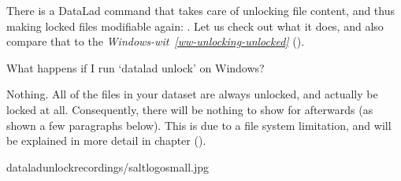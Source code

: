 \ignorespaces 
\sphinxAtStartPar
There is a DataLad command that takes care of unlocking file content,
and thus making locked files modifiable again: .
Let us check out what it does, and also compare that to the
\textit{Windows-wit}~{\windowswiticoninline}\textit{\ref{ww-unlocking-unlocked}} {\hyperref[\detokenize{basics/101-110-run2:ww-unlocking-unlocked}]{}} ().

\ignorespaces \begin{windowswit}[label={ww-unlocking-unlocked}, before title={\thetcbcounter\ }, float, floatplacement=tb, check odd page=true]{What happens if I run ‘datalad unlock’ on Windows?}
\label{\detokenize{basics/101-110-run2:ww-unlocking-unlocked}}

\sphinxAtStartPar
Nothing. All of the files in your dataset are always unlocked, and actually  be locked at all.
Consequently, there will be nothing to show for  afterwards (as shown a few paragraphs below).
This is due to a file system limitation, and will be explained in more detail in chapter {\hyperref[\detokenize{basics/basics-annex:chapter-gitannex}]{}} ().


\end{windowswit}

\begin{sphinxVerbatim}[commandchars=\\\{\}]
dataladunlockrecordings/salt\PYGZus{}logo\PYGZus{}small.jpg
\end{sphinxVerbatim}

